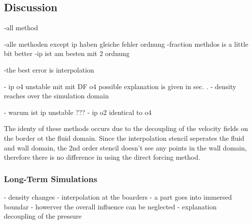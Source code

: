 \subsection{Discussion}

-all method



-alle methoden except ip haben gleiche fehler ordnung
-fraction methdos is a little bit better
-ip ist am besten mit 2 ordnung

-the best error is interpolation

- ip o4 unstable mit mit DF o4 possible explanation is given in sec. .
- density reaches over the simulation domain


- warum ist ip unstable ???
- ip o2 identical to o4


 The identy of these methods occurs due to the decoupling of the velocity fields
on the border ot the fluid domain. Since the interpolation stencil seperates the fluid and wall domain, the 2nd order
stencil doesn't see any points in the wall domain, therefore there is no difference in using the direct forcing method.\\

\subsubsection{Long-Term Simulations}
- density changes
- interpolation at the boarders
- a part goes into immersed boundar
- howerver the overall influence can be neglected
- explanation decoupling of the pressure


